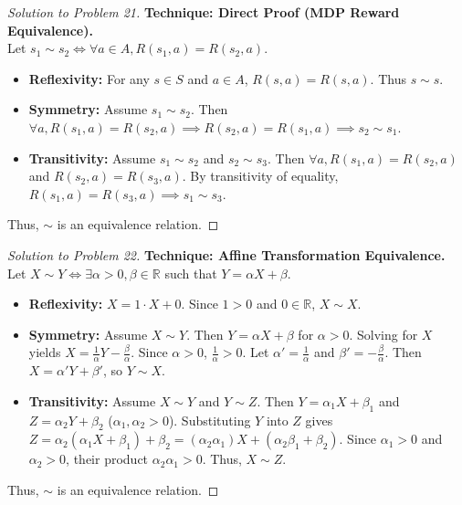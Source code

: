 \documentclass[11pt, a4paper]{article}
\theoremstyle{definition}
\theoremstyle{remark}
\newcommand{\R}{\mathbb{R}}
\begin{document}
\begin{proof}[Solution to Problem 21]
    \textbf{Technique: Direct Proof (MDP Reward Equivalence).} \\
    Let $s_1 \sim s_2 \iff \forall a \in A, R(s_1, a) = R(s_2, a)$.
    \begin{itemize}
        \item \textbf{Reflexivity:} For any $s \in S$ and $a \in A$, $R(s, a) = R(s, a)$. Thus $s \sim s$.
        \item \textbf{Symmetry:} Assume $s_1 \sim s_2$. Then $\forall a, R(s_1, a) = R(s_2, a) \implies R(s_2, a) = R(s_1, a) \implies s_2 \sim s_1$.
        \item \textbf{Transitivity:} Assume $s_1 \sim s_2$ and $s_2 \sim s_3$. Then $\forall a, R(s_1, a) = R(s_2, a)$ and $R(s_2, a) = R(s_3, a)$. By transitivity of equality, $R(s_1, a) = R(s_3, a) \implies s_1 \sim s_3$.
    \end{itemize}
    Thus, $\sim$ is an equivalence relation.
\end{proof}

\begin{proof}[Solution to Problem 22]
    \textbf{Technique: Affine Transformation Equivalence.} \\
    Let $X \sim Y \iff \exists \alpha > 0, \beta \in \R$ such that $Y = \alpha X + \beta$.
    \begin{itemize}
        \item \textbf{Reflexivity:} $X = 1 \cdot X + 0$. Since $1 > 0$ and $0 \in \R$, $X \sim X$.
        \item \textbf{Symmetry:} Assume $X \sim Y$. Then $Y = \alpha X + \beta$ for $\alpha > 0$. Solving for $X$ yields $X = \frac{1}{\alpha}Y - \frac{\beta}{\alpha}$. Since $\alpha > 0$, $\frac{1}{\alpha} > 0$. Let $\alpha' = \frac{1}{\alpha}$ and $\beta' = -\frac{\beta}{\alpha}$. Then $X = \alpha' Y + \beta'$, so $Y \sim X$.
        \item \textbf{Transitivity:} Assume $X \sim Y$ and $Y \sim Z$. Then $Y = \alpha_1 X + \beta_1$ and $Z = \alpha_2 Y + \beta_2$ ($\alpha_1, \alpha_2 > 0$). Substituting $Y$ into $Z$ gives $Z = \alpha_2(\alpha_1 X + \beta_1) + \beta_2 = (\alpha_2 \alpha_1)X + (\alpha_2 \beta_1 + \beta_2)$. Since $\alpha_1 > 0$ and $\alpha_2 > 0$, their product $\alpha_2 \alpha_1 > 0$. Thus, $X \sim Z$.
    \end{itemize}
    Thus, $\sim$ is an equivalence relation.
\end{proof}
\end{document}
